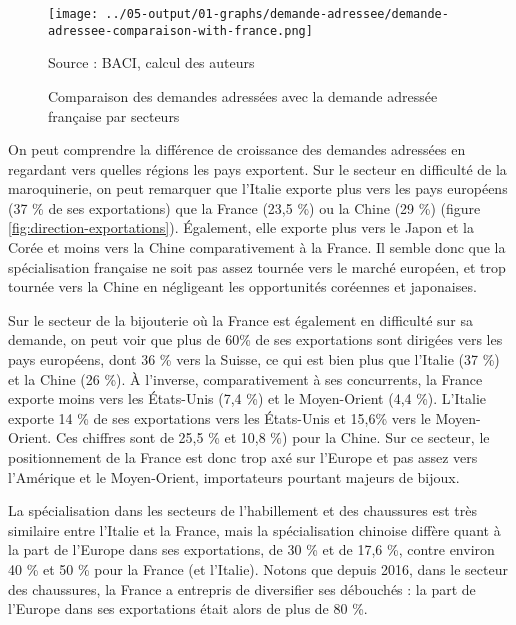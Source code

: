 \documentclass[french,10pt,a4paper]{article}
\begin{document}
\begin{figure}[!h]
  \centering
  \texttt{[image: ../05-output/01-graphs/demande-adressee/demande-adressee-comparaison-with-france.png]}
  \captionsetup{justification=raggedright,singlelinecheck=false, font=small}
  \caption*{Source : BACI, calcul des auteurs}
  \captionsetup{justification=centering, singlelinecheck=true, font=normalsize}
  \caption{Comparaison des demandes adressées avec la demande adressée française par secteurs}
  \label{fig:demande-adressee}
\end{figure}

\bigskip
On peut comprendre la différence de croissance des demandes adressées en regardant vers quelles régions les pays exportent. Sur le secteur en difficulté de la maroquinerie, on peut remarquer que l'Italie exporte plus vers les pays européens (37 \% de ses exportations) que la France (23,5 \%) ou la Chine (29 \%) (figure \ref{fig:direction-exportations}). Également, elle exporte plus vers le Japon et la Corée et moins vers la Chine comparativement à la France. Il semble donc que la spécialisation française ne soit pas assez tournée vers le marché européen, et trop tournée vers la Chine en négligeant les opportunités coréennes et japonaises. 

Sur le secteur de la bijouterie où la France est également en difficulté sur sa demande, on peut voir que plus de 60\% de ses exportations sont dirigées vers les pays européens, dont 36 \% vers la Suisse, ce qui est bien plus que l'Italie (37 \%) et la Chine (26 \%). À l'inverse, comparativement à ses concurrents, la France exporte moins vers les États-Unis (7,4 \%) et le Moyen-Orient (4,4 \%). L'Italie exporte 14 \% de ses exportations vers les États-Unis et 15,6\% vers le Moyen-Orient. Ces chiffres sont de 25,5 \% et 10,8 \%) pour la Chine. Sur ce secteur, le positionnement de la France est donc trop axé sur l'Europe et pas assez vers l'Amérique et le Moyen-Orient, importateurs pourtant majeurs de bijoux.

La spécialisation dans les secteurs de l'habillement et des chaussures est très similaire entre l'Italie et la France, mais la spécialisation chinoise diffère quant à la part de l'Europe dans ses exportations, de 30 \% et de 17,6 \%, contre environ 40 \% et 50 \% pour la France (et l’Italie). Notons que depuis 2016, dans le secteur des chaussures, la France a entrepris de diversifier ses débouchés : la part de l'Europe dans ses exportations était alors de plus de 80 \%. 
\end{document}
